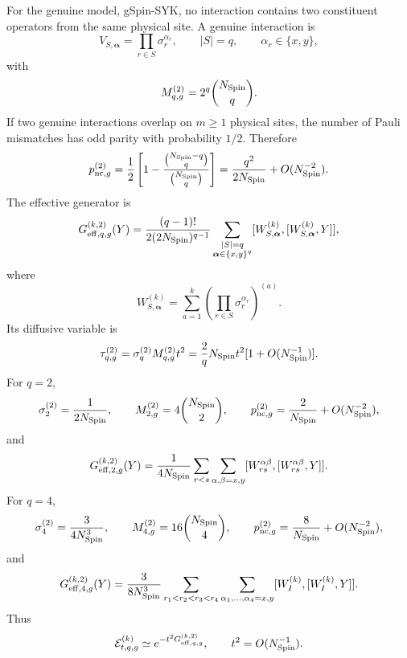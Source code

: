 \documentclass{article}
\theoremstyle{definition}
\begin{document}
For the genuine model, gSpin-SYK, no interaction contains two constituent
operators from the same physical site.  A genuine interaction is
\begin{equation}
    V_{S,\boldsymbol\alpha}
    =\prod_{r\in S}\sigma_r^{\alpha_r},
    \qquad
    |S|=q,
    \qquad
    \alpha_r\in\{x,y\},
\end{equation}
with
\begin{equation}
    M_{q,g}^{(2)}=2^q\binom{N_{\rm Spin}}q.
\end{equation}
If two genuine interactions overlap on $m\ge1$ physical sites, the number
of Pauli mismatches has odd parity with probability $1/2$.  Therefore
\begin{equation}
    p_{{\rm nc},g}^{(2)}
    =\frac12\left[
       1-\frac{\binom{N_{\rm Spin}-q}{q}}
               {\binom{N_{\rm Spin}}q}
    \right]
    =\frac{q^2}{2N_{\rm Spin}}+O(N_{\rm Spin}^{-2}).
\end{equation}
The effective generator is
\begin{equation}
    G_{{\rm eff},q,g}^{(k,2)}(Y)
    =\frac{(q-1)!}{2(2N_{\rm Spin})^{q-1}}
    \sum_{\substack{|S|=q\\
                    \boldsymbol\alpha\in\{x,y\}^q}}
    [W_{S,\boldsymbol\alpha}^{(k)},
     [W_{S,\boldsymbol\alpha}^{(k)},Y]],
\end{equation}
where
\begin{equation}
    W_{S,\boldsymbol\alpha}^{(k)}
    =\sum_{a=1}^k
    \left(\prod_{r\in S}\sigma_r^{\alpha_r}\right)^{(a)}.
\end{equation}
Its diffusive variable is
\begin{equation}
    \tau_{q,g}^{(2)}
    =\sigma_q^{(2)}M_{q,g}^{(2)}t^2
    =\frac{2}{q}N_{\rm Spin}t^2
      [1+O(N_{\rm Spin}^{-1})].
\end{equation}
For $q=2$,
\begin{equation}
    \sigma_2^{(2)}=\frac{1}{2N_{\rm Spin}},
    \qquad
    M_{2,g}^{(2)}=4\binom{N_{\rm Spin}}2,
    \qquad
    p_{{\rm nc},g}^{(2)}
    =\frac{2}{N_{\rm Spin}}+O(N_{\rm Spin}^{-2}),
\end{equation}
and
\begin{equation}
    G_{{\rm eff},2,g}^{(k,2)}(Y)
    =\frac{1}{4N_{\rm Spin}}
    \sum_{r<s}\sum_{\alpha,\beta=x,y}
    [W_{rs}^{\alpha\beta},[W_{rs}^{\alpha\beta},Y]].
\end{equation}
For $q=4$,
\begin{equation}
    \sigma_4^{(2)}=\frac{3}{4N_{\rm Spin}^3},
    \qquad
    M_{4,g}^{(2)}=16\binom{N_{\rm Spin}}4,
    \qquad
    p_{{\rm nc},g}^{(2)}
    =\frac{8}{N_{\rm Spin}}+O(N_{\rm Spin}^{-2}),
\end{equation}
and
\begin{equation}
    G_{{\rm eff},4,g}^{(k,2)}(Y)
    =\frac{3}{8N_{\rm Spin}^3}
    \sum_{r_1<r_2<r_3<r_4}
    \sum_{\alpha_1,\ldots,\alpha_4=x,y}
    [W_I^{(k)},[W_I^{(k)},Y]].
\end{equation}
Thus
\begin{equation}
    {\cal E}_{t,q,g}^{(k)}
    \simeq e^{-t^2G_{{\rm eff},q,g}^{(k,2)}},
    \qquad t^2=O(N_{\rm Spin}^{-1}).
\end{equation}
\end{document}
